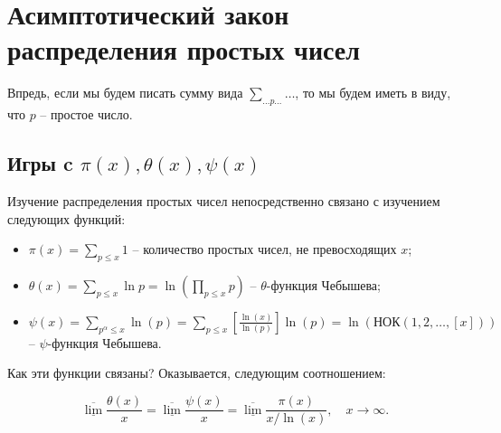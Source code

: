 \section{Асимптотический закон распределения простых чисел}
\begin{note}
	Впредь, если мы будем писать сумму вида $\displaystyle \sum_{ \ldots p \ldots} \ldots$, то мы будем иметь в виду, что $p$ -- простое число.
\end{note}

\subsection{Игры c $\pi(x), \theta(x), \psi(x)$}
Изучение распределения простых чисел непосредственно связано с изучением следующих функций:
\begin{itemize}[nolistsep]
   \item $\displaystyle \pi(x) = \sum_{p \leq x} 1$ -- количество простых чисел, не превосходящих $x$;
   \item $\displaystyle \theta(x) = \sum_{p \leq x} \ln p = \ln \left(\prod_{p \leq x} p\right)$ -- $\theta$-функция Чебышева;
   \item $\displaystyle \psi(x) = \sum_{p^{\alpha} \leq x} \ln(p) = \sum_{p \leq x} \left[\frac{\ln(x)}{\ln(p)}\right] \ln(p) = \ln \left( \text{НОК}(1, 2, \ldots, [x]) \right)$ -- $\psi$-функция Чебышева.
\end{itemize}
Как эти функции связаны? Оказывается, следующим соотношением:
\begin{lemma} \label{l1_lm1}
	$$\underline{\overline{\lim}} \frac{\theta(x)}{x} = \underline{\overline{\lim}} \frac{\psi(x)}{x} = \underline{\overline{\lim}} \frac{\pi(x)}{x / \ln(x)}, \quad x \to \infty.$$
\end{lemma}
